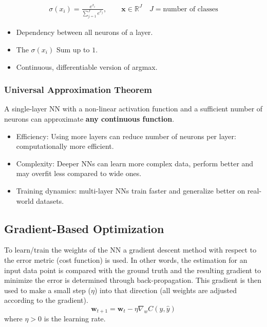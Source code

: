 \begin{gather*}
    \sigma(x_i) = \frac{e^{x_i}}{\sum_{j=1}^{J}e^{x_j}}, \qquad \mathbf{x} \in \mathbb{R}^J \quad J=\text{number of classes}
\end{gather*}
\begin{itemize}
   \item Dependency between all neurons of a layer.
   \item The $\sigma(x_i)$ Sum up to $1$.
   \item Continuous, differentiable version of argmax.
\end{itemize}

\subsubsection{Universal Approximation Theorem}
A single-layer NN with a non-linear activation function and a sufficient number of neurons can approximate \textbf{any continuous function}.
\newpar{}
\begin{itemize}
    \item Efficiency: Using more layers can reduce number of neurons per layer: computationally more efficient.
    \item Complexity: Deeper NNs can learn more complex data, perform better and may overfit less compared to wide ones.
    \item Training dynamics: multi-layer NNs train faster and generalize better on real-world datasets.
\end{itemize}

\renewcommand{\arraystretch}{1}
\setlength\tabcolsep{\oldtabcolsep}

\subsection{Gradient-Based Optimization}

To learn/train the weights of the NN a gradient descent method with respect to the error metric (cost function) is used. In other words, the estimation for an input data point is compared with the ground truth and the resulting gradient to minimize the error is determined through back-propagation. This gradient is then used to make a small step ($\eta$) into that direction (all weights are adjusted according to the gradient).
\begin{equation*}
    \mathbf{w}_{t+1} = \mathbf{w}_t - \eta \nabla_w C(y,\hat{y})
\end{equation*}
where $\eta > 0$ is the learning rate.

